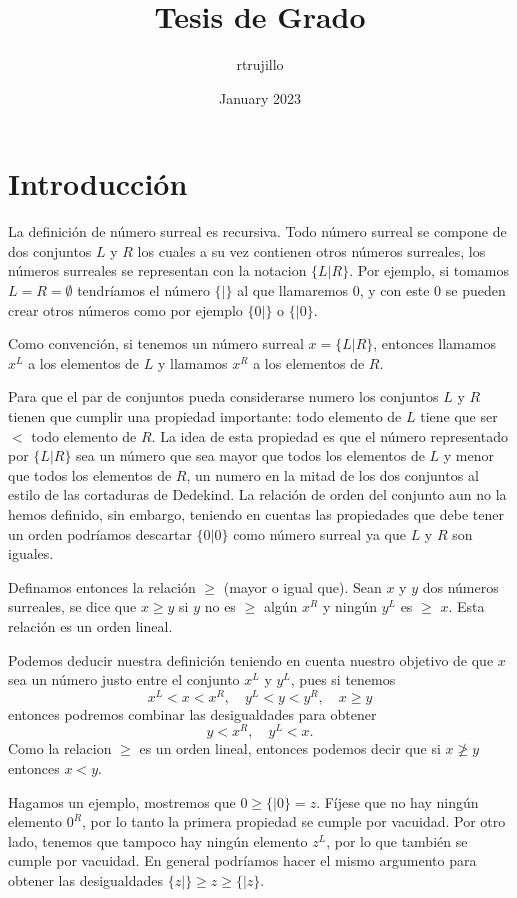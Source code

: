 \documentclass{article}
\title{Tesis de Grado}
\author{rtrujillo }
\date{January 2023}
\begin{document}
\maketitle

\section{Introducción}

    La definición de número surreal es recursiva. Todo número surreal se compone de dos conjuntos $L$ y $R$ los cuales a su vez contienen otros números surreales, los números surreales se representan con la notacion $\{L|R\}$. Por ejemplo, si tomamos $L=R=\emptyset$ tendríamos el número $\{|\}$ al que llamaremos $0$, y con este $0$ se pueden crear otros números como por ejemplo $\{0|\}$ o $\{|0\}$.
    
    Como convención, si tenemos un número surreal $x=\{L|R\}$, entonces llamamos $x^L$ a los elementos de $L$ y llamamos $x^R$ a los elementos de $R$.
    
    Para que el par de conjuntos pueda considerarse numero los conjuntos $L$ y $R$ tienen que cumplir una propiedad importante: todo elemento de $L$ tiene que ser $<$ todo elemento de $R$. La idea de esta propiedad es que el número representado por $\{L|R\}$ sea un número que sea mayor que todos los elementos de $L$ y menor que todos los elementos de $R$, un numero en la mitad de los dos conjuntos al estilo de las cortaduras de Dedekind. La relación de orden del conjunto aun no la hemos definido, sin embargo, teniendo en cuentas las propiedades que debe tener un orden podríamos descartar $\{0|0\}$ como número surreal ya que $L$ y $R$ son iguales. 
    
    Definamos entonces la relación $\ge$ (mayor o igual que). Sean $x$ y $y$ dos números surreales, se dice que $x\ge y$ si $y$ no es $\ge$ algún $x^R$ y ningún $y^L$ es $\ge$ $x$. Esta relación es un orden lineal.
    
    Podemos deducir nuestra definición teniendo en cuenta nuestro objetivo de que $x$ sea un número justo entre el conjunto $x^L$ y $y^L$, pues si tenemos
    \[
        x^L < x < x^R,\quad y^L < y < y^R,\quad x \ge y
    \]
    entonces podremos combinar las desigualdades para obtener
    \[
        y < x^R,\quad y^L < x.
    \]
    Como la relacion $\ge$ es un orden lineal, entonces podemos decir que si $x\not\ge y$ entonces $x < y$.
    
    Hagamos un ejemplo, mostremos que $0\ge\{|0\}=z$. Fíjese que no hay ningún elemento $0^R$, por lo tanto la primera propiedad se cumple por vacuidad. Por otro lado, tenemos que tampoco hay ningún elemento $z^L$, por lo que también se cumple por vacuidad. En general podríamos hacer el mismo argumento para obtener las desigualdades $\{z|\}\ge z\ge\{|z\}$.
\end{document}
